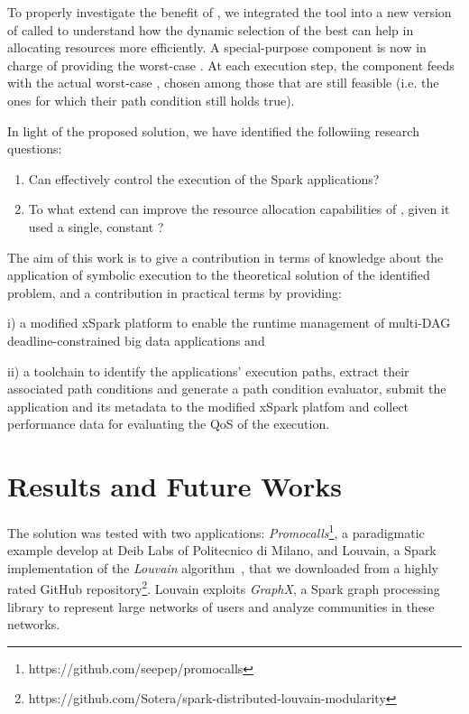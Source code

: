 
To properly investigate the benefit of \dSymb, we integrated the tool into a new version of  \cSpark called \tool to understand how the dynamic selection of the best \plan can help in allocating resources more efficiently. A special-purpose component is now in charge of providing the worst-case \plan. At each execution step, the component feeds \cSpark with the actual worst-case \plan, chosen among those that are still feasible (i.e. the ones for which their path condition still holds true). 

In light of the proposed solution, we have identified the followiing research questions:

\begin{enumerate}[\boldmath$RQ_1 : $] 
	\item Can \dSymb effectively control the execution of the Spark applications?
	\item To what extend can \dSymb improve the resource allocation capabilities of
	\cSpark, given it used a single, constant \plan?
\end{enumerate}

 The aim of this work is to give a contribution in terms of knowledge about the application of symbolic execution to the theoretical solution of the identified  problem, and a contribution in practical terms by providing: 
 
 i) a modified xSpark platform to enable the runtime management of multi-DAG deadline-constrained big data applications and 
 
 ii) a toolchain to identify the applications' execution paths,  extract their associated path conditions and generate a path condition evaluator, submit the application and its metadata to the modified xSpark platfom and collect performance data for evaluating the QoS of the execution. 

\section*{Results and Future Works}\label{sec:results_future_works}
The solution was tested with two applications:  \textit{Promocalls}\footnote{https://github.com/seepep/promocalls}, a paradigmatic example  develop at Deib Labs of Politecnico di Milano, and Louvain, a Spark implementation of the \textit{Louvain} algorithm~\cite{Louvain}, that we downloaded from a highly rated GitHub repository\footnote{https://github.com/Sotera/spark-distributed-louvain-modularity}. Louvain exploits \textit{GraphX}, a Spark graph processing library to represent large networks of users and analyze communities in these networks. 

